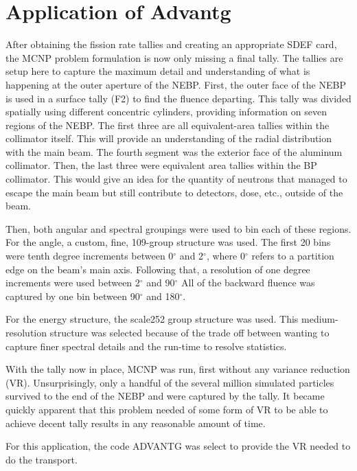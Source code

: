 \section{Application of Advantg}

After obtaining the fission rate tallies and creating an appropriate SDEF card, the MCNP problem formulation is now only missing a final tally.
The tallies are setup here to capture the maximum detail and understanding of what is happening at the outer aperture of the NEBP.
First, the outer face of the NEBP is used in a surface tally (F2) to find the fluence departing.
This tally was divided spatially using different concentric cylinders, providing information on seven regions of the NEBP.
The first three are all equivalent-area tallies within the collimator itself.
This will provide an understanding of the radial distribution with the main beam.
The fourth segment was the exterior face of the aluminum collimator.
Then, the last three were equivalent area tallies within the BP collimator.
This would give an idea for the quantity of neutrons that managed to escape the main beam but still contribute to detectors, dose, etc., outside of the beam.

Then, both angular and spectral groupings were used to bin each of these regions.
For the angle, a custom, fine, 109-group structure was used.
The first 20 bins were tenth degree increments between 0$^{\circ}$ and 2$^{\circ}$, where 0$^{\circ}$ refers to a partition edge on the beam's main axis.
Following that, a resolution of one degree increments were used between 2$^{\circ}$ and 90$^{\circ}$
All of the backward fluence was captured by one bin between 90$^{\circ}$ and 180$^{\circ}$.

For the energy structure, the scale252 group structure was used.
This medium-resolution structure was selected because of the trade off between wanting to capture finer spectral details and the run-time to resolve statistics.

With the tally now in place, MCNP was run, first without any variance reduction (VR).
Unsurprisingly, only a handful of the several million simulated particles survived to the end of the NEBP and were captured by the tally.
It became quickly apparent that this problem needed of some form of VR to be able to achieve decent tally results in any reasonable amount of time.

For this application, the code ADVANTG was select to provide the VR needed to do the transport.

